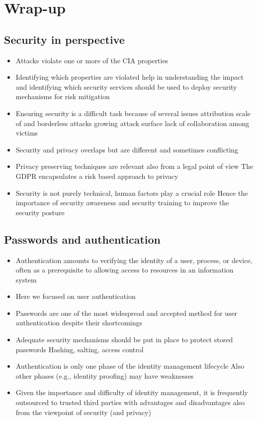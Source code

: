 \documentclass[12pt, a4paper]{article}
\begin{document}

\newpage
\section{Wrap-up}
\subsection{Security in perspective}
\begin{itemize}
    \item Attacks violate one or more of the CIA properties
    \item Identifying which properties are violated help in
    \subitem understanding the impact and
    \subitem identifying which security services should be used to deploy security mechanisms for risk mitigation
    \item Ensuring security is a difficult task because of several issues
    \subitem attribution
    \subitem scale of and borderless attacks
    \subitem growing attack surface
    \subitem lack of collaboration among victims
    \item Security and privacy overlaps but are different and sometimes conflicting
    \item Privacy preserving techniques are relevant also from a legal point of view
    \subitem The GDPR encapsulates a risk based approach to privacy
    \item Security is not purely technical, human factors play a crucial role
    \subitem Hence the importance of security awareness and security training to improve the security posture
\end{itemize}
\subsection{Passwords and authentication}
\begin{itemize}
    \item Authentication amounts to verifying the identity of a user, process, or device, often
    as a prerequisite to allowing access to resources in an information system
    \item Here we focused on user authentication
    \item Passwords are one of the most widespread and accepted method for user
    authentication despite their shortcomings
    \item Adequate security mechanisms should be put in place to protect stored passwords
    \subitem Hashing, salting, access control
    \item Authentication is only one phase of the identity management lifecycle
    \subitem Also other phases (e.g., identity proofing) may have weaknesses
    \item Given the importance and difficulty of identity management, it is frequently
    outsourced to trusted third parties with advantages and disadvantages also from
    the viewpoint of security (and privacy)
\end{itemize}
\end{document}
